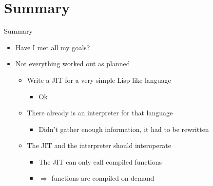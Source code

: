 \documentclass{beamer}
\begin{document}
	\section{Summary}

	\begin{frame}
		\Large
		\begin{center}
			Summary
		\end{center}
	\end{frame}

	\begin{frame}
		\begin{center}
			\begin{itemize}[<+->]
				\item[] Have I met all my goals?
				\item[] Not everything worked out as planned

				\begin{itemize}[<+->]
					\itemsep12pt
	
					\item Write a JIT for a very simple Lisp like language
						\begin{itemize}[<+->]
							\item[] Ok
						\end{itemize}					
					\item There already is an interpreter for that language 
						\begin{itemize}[<+->]
							\item[] Didn't gather enough information, it had to be rewritten
						\end{itemize}
					\item The JIT and the interpreter should interoperate   
						\begin{itemize}[<+->]
							\item[] The JIT can only call compiled functions 
							\item[] $\Rightarrow$ functions are compiled on demand
						\end{itemize}
				\end{itemize}
			\end{itemize}
		\end{center}
	\end{frame}
\end{document}
